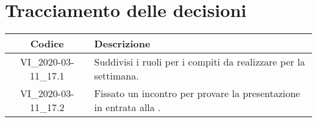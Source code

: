 \section*{Tracciamento delle decisioni}

\begin{center}
	\begin{longtable}{|c|p{12.25cm}|}
	\hline
	\rowcolor{lighter-grayer}
	\textbf{Codice} & \textbf{Descrizione} \\
	\hline
	\endfirsthead
	
	\hline
		VI\_2020-03-11\_17.1 & Suddivisi i ruoli per i compiti da realizzare per la settimana. \\
				VI\_2020-03-11\_17.2 & Fissato un incontro per provare la presentazione in entrata alla \glock{RP}. \\
	\hline

	\end{longtable}
\end{center}